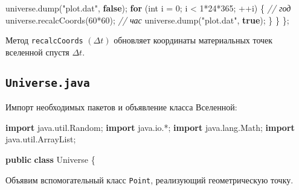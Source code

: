 \documentclass[
  12pt,
  a4paper,
]{article}
\newenvironment{Shaded}{}{}
\newcommand{\CommentTok}[1]{\textcolor[rgb]{0.38,0.63,0.69}{\textit{#1}}}
\newcommand{\ControlFlowTok}[1]{\textcolor[rgb]{0.00,0.44,0.13}{\textbf{#1}}}
\newcommand{\DataTypeTok}[1]{\textcolor[rgb]{0.56,0.13,0.00}{#1}}
\newcommand{\DecValTok}[1]{\textcolor[rgb]{0.25,0.63,0.44}{#1}}
\newcommand{\FunctionTok}[1]{\textcolor[rgb]{0.02,0.16,0.49}{#1}}
\newcommand{\ImportTok}[1]{#1}
\newcommand{\KeywordTok}[1]{\textcolor[rgb]{0.00,0.44,0.13}{\textbf{#1}}}
\newcommand{\NormalTok}[1]{#1}
\newcommand{\OperatorTok}[1]{\textcolor[rgb]{0.40,0.40,0.40}{#1}}
\newcommand{\StringTok}[1]{\textcolor[rgb]{0.25,0.44,0.63}{#1}}
\begin{document}
\begin{Shaded}
\begin{Highlighting}[]
\NormalTok{        universe}\OperatorTok{.}\FunctionTok{dump}\OperatorTok{(}\StringTok{"plot.dat"}\OperatorTok{,} \KeywordTok{false}\OperatorTok{);}
        \ControlFlowTok{for} \OperatorTok{(}\DataTypeTok{int}\NormalTok{ i }\OperatorTok{=} \DecValTok{0}\OperatorTok{;}\NormalTok{ i }\OperatorTok{\textless{}} \DecValTok{1}\OperatorTok{*}\DecValTok{24}\OperatorTok{*}\DecValTok{365}\OperatorTok{;} \OperatorTok{++}\NormalTok{i}\OperatorTok{)} \OperatorTok{\{} \CommentTok{// год}
\NormalTok{            universe}\OperatorTok{.}\FunctionTok{recalcCoords}\OperatorTok{(}\DecValTok{60}\OperatorTok{*}\DecValTok{60}\OperatorTok{);} \CommentTok{// час}
\NormalTok{            universe}\OperatorTok{.}\FunctionTok{dump}\OperatorTok{(}\StringTok{"plot.dat"}\OperatorTok{,} \KeywordTok{true}\OperatorTok{);}
        \OperatorTok{\}}
    \OperatorTok{\}}
\OperatorTok{\};}
\end{Highlighting}
\end{Shaded}

Метод \texttt{recalcCoords} \((\Delta t)\) обновляет координаты
материальных точек вселенной спустя \(\Delta t\).

\hypertarget{universe.java}{%
\subsection{\texorpdfstring{\texttt{Universe.java}}{Universe.java}}\label{universe.java}}

Импорт необходимых пакетов и объявление класса Вселенной:

\begin{Shaded}
\begin{Highlighting}[]
\KeywordTok{import} \ImportTok{java}\OperatorTok{.}\ImportTok{util}\OperatorTok{.}\ImportTok{Random}\OperatorTok{;}
\KeywordTok{import} \ImportTok{java}\OperatorTok{.}\ImportTok{io}\OperatorTok{.*;}
\KeywordTok{import} \ImportTok{java}\OperatorTok{.}\ImportTok{lang}\OperatorTok{.}\ImportTok{Math}\OperatorTok{;}
\KeywordTok{import} \ImportTok{java}\OperatorTok{.}\ImportTok{util}\OperatorTok{.}\ImportTok{ArrayList}\OperatorTok{;}

\KeywordTok{public} \KeywordTok{class}\NormalTok{ Universe }\OperatorTok{\{}
\end{Highlighting}
\end{Shaded}

Объявим вспомогательный класс \texttt{Point}, реализующий геометрическую
точку.
\end{document}
